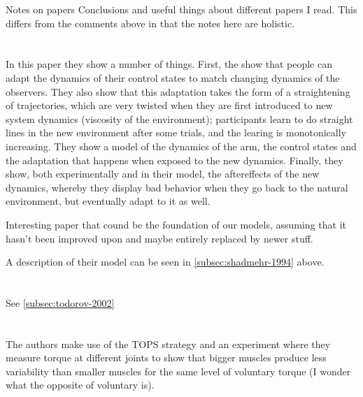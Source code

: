 \documentclass{report}
\begin{document}



\begin{chapter}{Notes on papers}
Conclusions and useful things about different papers I read. This differs from
the comments above in that the notes here are holistic.

\section{\cite{Shadmehr_Adaptive_1994}}
In this paper they show a number of things. First, the show that people can
adapt the dynamics of their control states to match changing dynamics of the
observers. They also show that this adaptation takes the form of a straightening
of trajectories, which are very twisted when they are first introduced to new
system dynamics (viscosity of the environment); participants learn to do
straight lines in the new environment after some trials, and the learing is
monotonically increasing. They show a model of the dynamics of the arm, the
control states and the adaptation that happens when exposed to the new
dynamics. Finally, they show, both experimentally and in their model, the
aftereffects of the new dynamics, whereby they display bad behavior when they go
back to the natural environment, but eventually adapt to it as well.

Interesting paper that cound be the foundation of our models, assuming that it
hasn't been improved upon and maybe entirely replaced by newer stuff.

A description of their model can be seen in \ref{subsec:shadmehr-1994} above.

\section{\cite{Todorov_Optimal_2002}}
See \ref{subsec:todorov-2002}

\section{\cite{deC.Hamilton_scaling_2004}}
The authors make use of the TOPS strategy \citep{Harris_Signaldependent_1998}
and an experiment where they measure torque at different joints to show that
bigger muscles produce less variability than smaller muscles for the same level
of voluntary torque (I wonder what the opposite of voluntary is).


\end{chapter}
\end{document}
